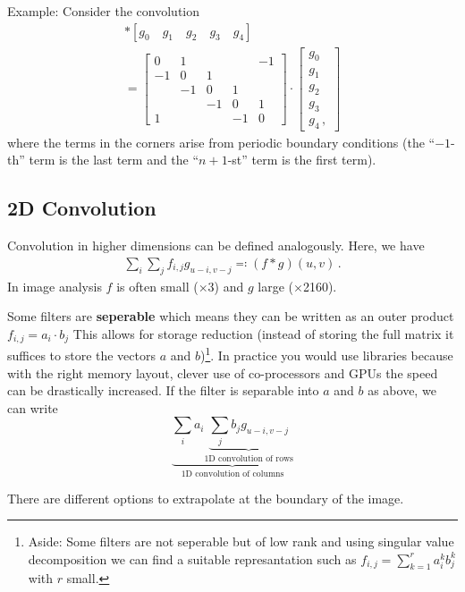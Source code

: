 Example: Consider the convolution
\begin{gather*}
  [1 \quad 0 \quad -1] \ast [g_0\quad g_1\quad g_2\quad g_3 \quad g_4] \\
  =
  \begin{bmatrix}
    0 & 1 & & & -1 \\
    -1 & 0 & 1 & & \\
    & -1 & 0 & 1 & \\
    & & -1 & 0 & 1 \\
    1 & & & -1 & 0
  \end{bmatrix}\cdot
  \begin{bmatrix}
    g_0 \\ g_1 \\ g_2 \\ g_3 \\ g_4\,,
  \end{bmatrix}
\end{gather*}
where the terms in the corners arise from periodic boundary conditions (\ie the
``$-1$-th'' term is the last term and the ``$n+1$-st'' term is the first term).

\subsection*{2D Convolution}
Convolution in higher dimensions can be defined analogously. Here, we
have
\begin{gather*}
  \sum_i \sum_j f_{i,j}g_{u-i,v-j} \eqqcolon (f \ast g)(u,v)\,.
\end{gather*}
In image analysis $f$ is often small ($\times$3) and $g$ large
($\times$2160).

Some filters are \textbf{seperable} which means they can be written as
an outer product $f_{i,j} = a_i \cdot b_j$ This allows for storage
reduction (instead of storing the full matrix it suffices to store the
vectors $a$ and $b$)\footnote{Aside: Some filters are not seperable
  but of low rank and using singular value decomposition we can find a
  suitable represantation such as $f_{i,j} = \sum_{k=1}^r a_i^k b_j^k$
  with $r$ small.}. In practice you would use libraries because with
the right memory layout, clever use of co-processors and GPUs the
speed can be drastically increased. If the filter is separable into
$a$ and $b$ as above, we can write
\begin{equation*}
  \underbrace{
    \sum_i a_i \underbrace{
      \sum_j b_j g_{u-i,v-j}
    }_{\text{1D convolution of rows}}
  }_{\text{1D convolution of columns}}
\end{equation*}

There are different options to extrapolate at the boundary of the
image.


